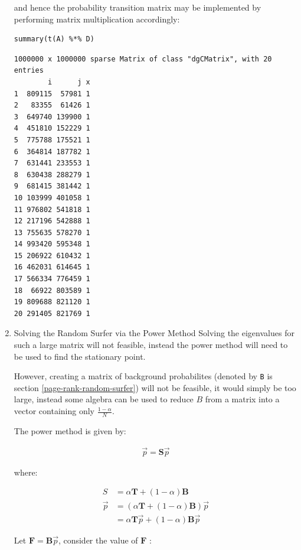 \documentclass[11pt]{article}
\begin{document}
\begin{enumerate}
and hence the probability transition matrix may be implemented by performing matrix multiplication accordingly:

\lstset{language=r,label= ,caption= ,captionpos=b,numbers=none}
\begin{lstlisting}
summary(t(A) %*% D)
\end{lstlisting}

\begin{verbatim}
1000000 x 1000000 sparse Matrix of class "dgCMatrix", with 20 entries
        i      j x
1  809115  57981 1
2   83355  61426 1
3  649740 139900 1
4  451810 152229 1
5  775788 175521 1
6  364814 187782 1
7  631441 233553 1
8  630438 288279 1
9  681415 381442 1
10 103999 401058 1
11 976802 541818 1
12 217196 542888 1
13 755635 578270 1
14 993420 595348 1
15 206922 610432 1
16 462031 614645 1
17 566334 776459 1
18  66922 803589 1
19 809688 821120 1
20 291405 821769 1
\end{verbatim}

\item Solving the Random Surfer via the Power Method
\label{sec:org0fa8856}
Solving the eigenvalues for such a large matrix will not feasible, instead the power method will need to be used to find the stationary point.

However, creating a matrix of background probabilites (denoted by \texttt{B} is section \ref{page-rank-random-surfer}) will not be feasible, it would simply be too large, instead some algebra can be used to reduce \(B\) from a matrix into a vector containing only \(\frac{1-\alpha}{N}\).

The power method is given by:

\begin{align}
\vec{p}= \mathbf{S} \vec{p}
\end{align}

where:

\begin{align}
S &= \alpha \mathbf{T} +  \left( 1 - \alpha \right) \mathbf{B} \\
\vec{p} &= \left( \alpha \mathbf{T} +  \left( 1 - \alpha \right) \mathbf{B} \right) \vec{p}\\
&= \alpha \mathbf{T}\vec{p} +  \left( 1-\alpha \right) \mathbf{B} \vec{p}
\end{align}

Let \(\mathbf{F}= \mathbf{B}\vec{p}\), consider the value of \(\mathbf{F}\) :


\end{enumerate}
\end{document}
